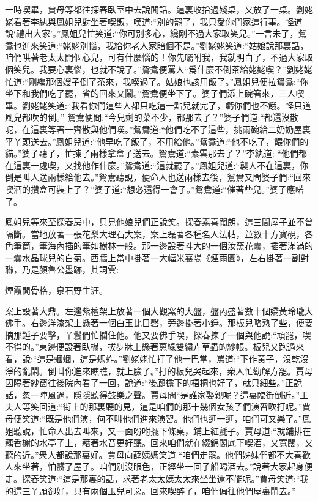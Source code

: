 \begin{parag}
    一時喫畢，賈母等都往探春臥室中去說閒話。這裏收拾過殘桌，又放了一桌。劉姥姥看著李紈與鳳姐兒對坐著喫飯，嘆道:“別的罷了，我只愛你們家這行事。怪道說‘禮出大家’。”鳳姐兒忙笑道:“你可別多心，纔剛不過大家取笑兒。”一言未了，鴛鴦也進來笑道:“姥姥別惱，我給你老人家賠個不是。”劉姥姥笑道:“姑娘說那裏話，咱們哄著老太太開個心兒，可有什麼惱的！你先囑咐我，我就明白了，不過大家取個笑兒。我要心裏惱，也就不說了。”鴛鴦便罵人“爲什麼不倒茶給姥姥喫？”劉姥姥忙道:“剛纔那個嫂子倒了茶來，我喫過了。姑娘也該用飯了。”鳳姐兒便拉鴛鴦:“你坐下和我們吃了罷，省的回來又鬧。”鴛鴦便坐下了。婆子們添上碗箸來，三人喫畢。劉姥姥笑道:“我看你們這些人都只吃這一點兒就完了，虧你們也不餓。怪只道風兒都吹的倒。” 鴛鴦便問:“今兒剩的菜不少，都那去了？”婆子們道:“都還沒散呢，在這裏等著一齊散與他們喫。”鴛鴦道:“他們吃不了這些，挑兩碗給二奶奶屋裏平丫頭送去。”鳳姐兒道:“他早吃了飯了，不用給他。”鴛鴦道:“他不吃了，餵你們的貓。”婆子聽了，忙揀了兩樣拿盒子送去。鴛鴦道:“素雲那去了？”李紈道: “他們都在這裏一處喫，又找他作什麼。”鴛鴦道:“這就罷了。”鳳姐兒道:“襲人不在這裏，你倒是叫人送兩樣給他去。”鴛鴦聽說，便命人也送兩樣去後，鴛鴦又問婆子們:“回來喫酒的攢盒可裝上了？”婆子道:“想必還得一會子。”鴛鴦道:“催著些兒。”婆子應喏了。
\end{parag}


\begin{parag}
    鳳姐兒等來至探春房中，只見他娘兒們正說笑。探春素喜闊朗，這三間屋子並不曾隔斷。當地放著一張花梨大理石大案，案上磊著各種名人法帖，並數十方寶硯，各色筆筒，筆海內插的筆如樹林一般。那一邊設著斗大的一個汝窯花囊，插著滿滿的一囊水晶球兒的白菊。西牆上當中掛著一大幅米襄陽《煙雨圖》，左右掛著一副對聯，乃是顏魯公墨跡，其詞雲:
\end{parag}


\begin{poem}
    \begin{pl}煙霞閒骨格，泉石野生涯。\end{pl}
\end{poem}


\begin{parag}
    案上設著大鼎。左邊紫檀架上放著一個大觀窯的大盤，盤內盛著數十個嬌黃玲瓏大佛手。右邊洋漆架上懸著一個白玉比目磬，旁邊掛著小錘。那板兒略熟了些，便要摘那錘子要擊，丫鬟們忙攔住他。他又要佛手喫，探春揀了一個與他說:“頑罷，喫不得的。”東邊便設著臥榻，拔步牀上懸著蔥綠雙繡卉草蟲的紗帳。板兒又跑過來看，說:“這是蟈蟈，這是螞蚱。”劉姥姥忙打了他一巴掌，罵道:“下作黃子，沒乾沒淨的亂鬧。倒叫你進來瞧瞧，就上臉了。”打的板兒哭起來，衆人忙勸解方罷。賈母因隔著紗窗往後院內看了一回，說道:“後廊檐下的梧桐也好了，就只細些。”正說話，忽一陣風過，隱隱聽得鼓樂之聲。賈母問“是誰家娶親呢？這裏臨街倒近。”王夫人等笑回道:“街上的那裏聽的見，這是咱們的那十幾個女孩子們演習吹打呢。”賈母便笑道:“既是他們演，何不叫他們進來演習。他們也逛一逛，咱們可又樂了。”鳳姐聽說，忙命人出去叫來，又一面吩咐擺下條桌，鋪上紅氈子。賈母道:“就鋪排在藕香榭的水亭子上，藉著水音更好聽。回來咱們就在綴錦閣底下喫酒，又寬闊，又聽的近。”衆人都說那裏好。賈母向薛姨媽笑道:“咱們走罷。他們姊妹們都不大喜歡人來坐著，怕髒了屋子。咱們別沒眼色，正經坐一回子船喝酒去。”說著大家起身便走。探春笑道:“這是那裏的話，求著老太太姨太太來坐坐還不能呢。”賈母笑道:“我的這三丫頭卻好，只有兩個玉兒可惡。回來喫醉了，咱們偏往他們屋裏鬧去。”
\end{parag}


